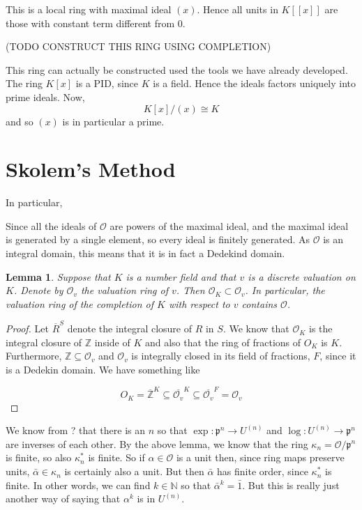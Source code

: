 \documentclass{article}
\newtheorem{lemma}{Lemma}[section]
\newcommand{\mfrak}[1]{\mathfrak{#1}}
\newcommand{\mcal}[1]{\mathcal{#1}}
\newcommand{\mbb}[1]{\mathbb{#1}}
\begin{document}
This is a local ring with maximal ideal $(x)$. Hence all units in $K[[x]]$ are those with constant term different from 0. 


(TODO CONSTRUCT THIS RING USING COMPLETION)

This ring can actually be constructed used the tools we have already developed. The ring $K[x]$ is a PID, since $K$ is a field. Hence the ideals factors uniquely into prime ideals. Now, 
$$K[x] /(x) \cong K$$
and so $(x)$ is in particular a prime. 


\section{Skolem's Method}

In particular, 







Since all the ideals of $\mcal O$ are powers of the maximal ideal, and the maximal ideal is generated by a single element, so every ideal is finitely generated. As $\mcal O$ is an integral domain, this means that it is in fact a Dedekind domain. 

\begin{lemma}
    Suppose that $K$ is a number field and that $v$ is a discrete valuation on $K$. Denote by $\mcal O_v$ the valuation ring of $v$. Then $\mcal O_K \subset \mcal O_v$. In particular, the valuation ring of the completion of $K$ with respect to $v$ contains $\mcal O$.
\end{lemma}

\begin{proof}
    Let $\overline{R}^S$ denote the integral closure of $R$ in $S$. We know that $\mcal O_K$ is the integral closure of $\mbb Z$ inside of $K$ and also that the ring of fractions of $O_K$ is $K$. Furthermore, $\mbb Z \subseteq \mcal O_v$ and $\mcal O_v$ is integrally closed in its field of fractions, $F$, since it is a Dedekin domain. We have something like 

    $$O_K = \overline {\mbb{Z}}^K \subseteq \overline {\mcal O_v}^K \subseteq \overline {\mcal O_v}^F = \mcal O_v$$ 
    
\end{proof}



We know from ? that there is an $n$ so that $\exp : \mfrak p^n \to U^{(n)}$ and $\log : U^{(n)} \to \mfrak p^n$ are inverses of each other. By the above lemma, we know that the ring $\kappa_n = \mcal{O} / \mfrak p^n$ is finite, so also $\kappa_n^*$ is finite. So if $\alpha \in \mcal O$ is a unit then, since ring maps preserve units, $\bar \alpha \in \kappa_n$ is certainly also a unit. But then $\bar \alpha$ has finite order, since $\kappa_n^*$ is finite. In other words, we can find $k \in \mbb N$ so that $\bar \alpha^k = \bar 1$. But this is really just another way of saying that $\alpha^k$ is in $U^{(n)}$.
\end{document}
